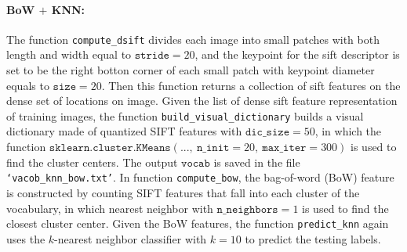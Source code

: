 \documentclass[11pt]{scrartcl}
\begin{document}
\begin{figure}[H]
	\captionsetup[subfigure]{labelformat=empty}
	\centering
	\label{fig:confusion}
\end{figure}

\paragraph{\textbf{BoW $+$ KNN:}} 
The function \texttt{compute\_dsift} divides each image into small patches with both length and width equal to $\texttt{stride}=20$, and the keypoint for the sift descriptor is set to be the right botton corner of each small patch with keypoint diameter equals to $\texttt{size}=20$. Then this function returns a collection of sift features on the dense set of locations on image. Given the list of dense sift feature representation of training images, the function \texttt{build\_visual\_dictionary} builds a visual dictionary made of quantized SIFT features with $\texttt{dic\_size}=50$, in which the function $\texttt{sklearn.cluster.KMeans}(...,~\texttt{n\_init}=20,~\texttt{max\_iter}=300)$ is used to find the cluster centers. The output $\texttt{vocab}$ is saved in the file \texttt{`vacob\_knn\_bow.txt'}. In function \texttt{compute\_bow}, the bag-of-word (BoW) feature is constructed by counting SIFT features that fall into each cluster of the vocabulary, in which nearest neighbor with $\texttt{n\_neighbors}=1$ is used to find the closest cluster center.  Given the BoW features, the function \texttt{predict\_knn} again uses the $k$-nearest neighbor classifier with $k=10$  to predict the testing labels.
\end{document}
